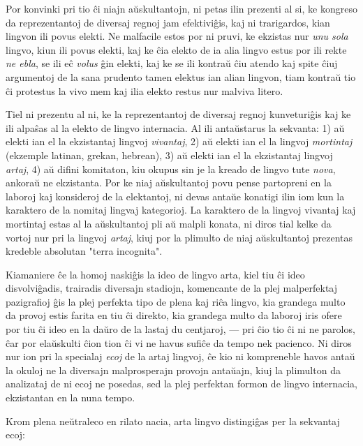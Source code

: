    Por konvinki pri tio \^ci niajn a\u uskultantojn, ni petas ilin
prezenti al si, ke kongreso da reprezentantoj de diversaj regnoj jam
efektivi\^gis, kaj ni trarigardos, kian lingvon ili povus elekti. Ne
malfacile estos por ni pruvi, ke ekzistas nur {\sl unu sola} lingvo,
kiun ili povus elekti, kaj ke \^cia elekto de ia alia lingvo estus
por ili rekte {\sl ne ebla}, se ili e\^c {\sl volus} \^gin elekti,
kaj ke se ili kontra\u u \^ciu atendo kaj spite \^ciuj argumentoj de
la sana prudento tamen elektus ian alian lingvon, tiam kontra\u u
tio \^ci protestus la vivo mem kaj ilia elekto restus nur malviva
litero.

   Tiel ni prezentu al ni, ke la reprezentantoj de diversaj regnoj
kunveturi\^gis kaj ke ili alpa\^sas al la elekto de lingvo
internacia. Al ili anta\u ustarus la sekvanta: 1) a\u u elekti ian
el la ekzistantaj lingvoj {\sl vivantaj}, 2) a\u u elekti ian el la
lingvoj {\sl mortintaj} (ekzemple latinan, grekan, hebrean), 3) a\u
u elekti ian el la ekzistantaj lingvoj {\sl artaj}, 4) a\u u difini
komitaton, kiu okupus sin je la kreado de lingvo tute {\sl nova},
ankora\u u ne ekzistanta. Por ke niaj a\u uskultantoj povu pense
partopreni en la laboroj kaj konsideroj de la elektantoj, ni devas
anta\u ue konatigi ilin iom kun la karaktero de la nomitaj lingvaj
kategorioj. La karaktero de la lingvoj vivantaj kaj mortintaj estas
al la a\u uskultantoj pli a\u u malpli konata, ni diros tial kelke
da vortoj nur pri la lingvoj {\sl artaj}, kiuj por la plimulto de
niaj a\u uskultantoj prezentas kredeble absolutan "terra
incognita".

   Kiamaniere \^ce la homoj naski\^gis la ideo de lingvo arta, kiel tiu
\^ci ideo disvolvi\^gadis, trairadis diversajn stadiojn, komencante
de la plej malperfektaj pazigrafioj \^gis la plej perfekta tipo de
plena kaj ri\^ca lingvo, kia grandega multo da provoj estis farita
en tiu \^ci direkto, kia grandega multo da laboroj iris ofere por
tiu \^ci ideo en la da\u uro de la lastaj du centjaroj, --- pri
\^cio tio \^ci ni ne parolos, \^car por ela\u uskulti \^cion tion
\^ci vi ne havus sufi\^ce da tempo nek pacienco. Ni diros nur ion
pri la specialaj {\sl ecoj} de la artaj lingvoj, \^ce kio ni
kompreneble havos anta\u u la okuloj ne la diversajn malprosperajn
provojn anta\u uajn, kiuj la plimulton da analizataj de ni ecoj ne
posedas, sed la plej perfektan formon de lingvo internacia,
ekzistantan en la nuna tempo.

   Krom plena ne\u utraleco en rilato nacia, arta lingvo distingi\^gas per
la sekvantaj ecoj:

